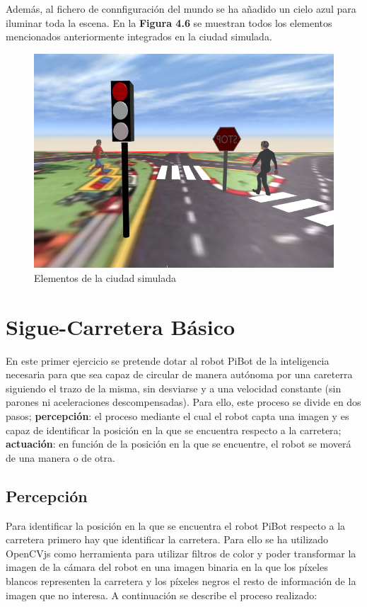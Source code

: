 \documentclass{report}
\begin{document}
Además, al fichero de connfiguración del mundo se ha añadido un cielo azul para iluminar toda la escena. En la \textbf{Figura 4.6} se muestran todos los elementos mencionados anteriormente integrados en la ciudad simulada.
\hfill \break
\hfill \break
\hfill \break
\renewcommand{\figurename}{Figura}		
\begin{figure}[h]
	\centering
	 \includegraphics[scale=0.4]{images/cap4/ciudad-simulada.png}
	 \caption{Elementos de la ciudad simulada}
\end{figure}

\newpage
\section{Sigue-Carretera Básico}
En este primer ejercicio se pretende dotar al robot PiBot de la inteligencia necesaria para que sea capaz de circular de manera autónoma por una careterra siguiendo el trazo de la misma, sin desviarse y a una velocidad constante (sin parones ni aceleraciones descompensadas). Para ello, este proceso se divide en dos pasos; \textbf{percepción}: el proceso mediante el cual el robot capta una imagen y es capaz de identificar la posición en la que se encuentra respecto a la carretera; \textbf{actuación}: en función de la posición en la que se encuentre, el robot se moverá de una manera o de otra.


\subsection{Percepción}

Para identificar la posición en la que se encuentra el robot PiBot respecto a la carretera primero hay que identificar la carretera. Para ello se ha utilizado OpenCVjs como herramienta para utilizar filtros de color y poder transformar la imagen de la cámara del robot en una imagen binaria en la que los píxeles blancos representen la carretera y los píxeles negros el resto de información de la imagen que no interesa. A continuación se describe el proceso realizado:
\\
\end{document}
